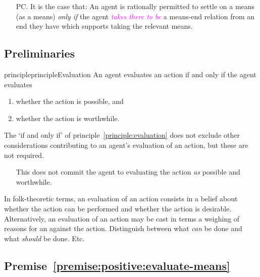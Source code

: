 \documentclass[10pt]{article}
\newcommand{\hand}{\ding{43}}
\newcommand{\hozlinedash}[0]{%
  \noindent\hdashrule[0.5ex][c]{\textwidth}{.1pt}{2.5pt}
}
\begin{document}
\begin{enumerate}[label=P\arabic*., ref=(P\arabic*), resume]
\item[PC.] It is the case that:
  An agent is rationally permitted to settle on a means (as a means)  \emph{only if} the agent \textcolor{fuchsia}{\emph{takes there to be}} a means-end relation from an end they have which supports taking the relevant means.
\end{enumerate}

\hozlinedash

\subsection{Preliminaries}
\label{sec:preliminaries-2}

\begin{restatable}[Evaluation]{principle}{principleEvaluation}\label{principle:evaluation}
  An agent evaluates an action if and only if the agent evaluates
  \begin{enumerate}[noitemsep]
  \item whether the action is possible, and
  \item whether the action is worthwhile.
  \end{enumerate}
\end{restatable}

The `if and only if' of principle~\ref{principle:evaluation} does not exclude other considerations contributing to an agent's evaluation of an action, but these are not required.

\begin{itemize}
\item[\hand] This does not commit the agent to evaluating the action \emph{as} possible and worthwhile.
\end{itemize}

In folk-theoretic terms, an evaluation of an action consists in a belief about whether the action can be performed and whether the action is desirable.
Alternatively, an evaluation of an action may be cast in terms a weighing of reasons for an against the action.
Distinguish between what \emph{can} be done and what \emph{should} be done.
Etc.

\newpage

\subsection{Premise~\ref{premise:positive:evaluate-means}}
\label{sec:positive:evaluate-means}
\end{document}
